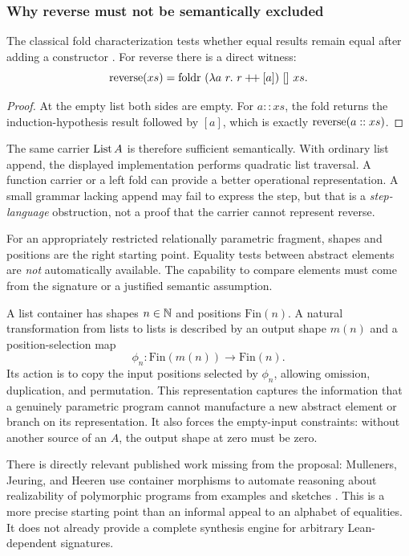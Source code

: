 \subsubsection*{Why reverse must not be semantically excluded}

The classical fold characterization tests whether equal results remain equal after adding a constructor \cite{whenfold}. For reverse there is a direct witness:
\[
  \rev(xs)=\foldr\ (\lambda a\ r.\ r\concat[a])\ []\ xs.
\]
\begin{proof}
At the empty list both sides are empty. For $a::xs$, the fold returns the induction-hypothesis result followed by $[a]$, which is exactly $\operatorname{reverse}(a::xs)$.
\end{proof}
The same carrier $\operatorname{List} A$ is therefore sufficient semantically. With ordinary list append, the displayed implementation performs quadratic list traversal. A function carrier or a left fold can provide a better operational representation. A small grammar lacking append may fail to express the step, but that is a \emph{step-language} obstruction, not a proof that the carrier cannot represent reverse.

\ans For an appropriately restricted relationally parametric fragment, shapes and positions are the right starting point. Equality tests between abstract elements are \emph{not} automatically available. The capability to compare elements must come from the signature or a justified semantic assumption.

A list container has shapes $n\in\mathbb N$ and positions $\mathrm{Fin}(n)$. A natural transformation from lists to lists is described by an output shape $m(n)$ and a position-selection map
\[
  \phi_n:\mathrm{Fin}(m(n))\to\mathrm{Fin}(n).
\]
Its action is to copy the input positions selected by $\phi_n$, allowing omission, duplication, and permutation. This representation captures the information that a genuinely parametric program cannot manufacture a new abstract element or branch on its representation. It also forces the empty-input constraints: without another source of an $A$, the output shape at zero must be zero.

There is directly relevant published work missing from the proposal: Mulleners, Jeuring, and Heeren use container morphisms to automate reasoning about realizability of polymorphic programs from examples and sketches \cite{polymorphic}. This is a more precise starting point than an informal appeal to an alphabet of equalities. It does not already provide a complete synthesis engine for arbitrary Lean-dependent signatures.

